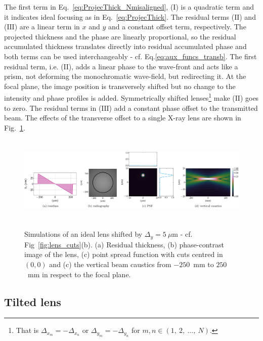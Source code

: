 \begin{refsection}
The first term in Eq.~\ref{eq:ProjecThick_Nmisaligned}, ($\text{I}$) is a quadratic term and it indicates ideal focusing as in Eq.~\ref{eq:ProjecThick}. The residual terms ($\text{II}$) and ($\text{III}$) are a linear term in $x$ and $y$ and a constant offset term, respectively. The projected thickness and the phase are linearly proportional, so the residual accumulated thickness translates directly into residual accumulated phase and both terms can be used interchangeably - cf. Eq.\ref{eq:aux_funcs_transb}. The first residual term, i.e. ($\text{II}$), adds a linear phase to the wave-front and acts like a prism, not deforming the monochromatic wave-field, but redirecting it. At the focal plane, the image position is transversely shifted but no change to the intensity and phase profiles is added. Symmetrically shifted lenses\footnote{That is $\Delta_{x_m}=-\Delta_{x_n}$ or $\Delta_{y_m}=-\Delta_{y_n}$ for $m,n\in(1,~2,~...,~N)$.} make ($\text{II}$) goes to zero. The residual terms in ($\text{III}$) add a constant phase offset to the transmitted beam. The effects of the transverse offset to a single X-ray lens are shown in Fig.~\ref{fig:shifted_CRL}.

\begin{figure}[t]
        \centering
         {\includegraphics[height=4.19cm]{figures/ch04/shifted_CRL.pdf}}
        \caption[Effects of a transverse CRL offset]{Simulations of an ideal lens shifted by $\Delta_y=5~\mu$m - cf. Fig~\ref{fig:lens_cuts}(b). (a) Residual thickness, (b) phase-contrast image of the lens, (c) point spread function with cuts centred in $(0,0)$ and (c) the vertical beam caustics from $-250$~mm to $250$~mm in respect to the focal plane.} \label{fig:shifted_CRL}
\end{figure}

\subsection{Tilted lens}


\end{refsection}
